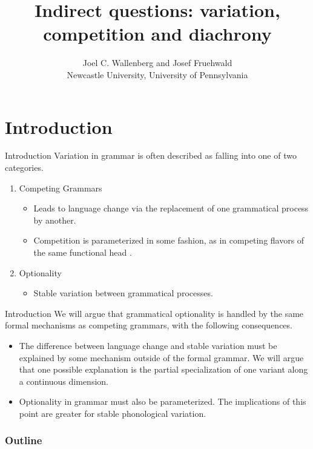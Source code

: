 \documentclass[hyperref={pdfpagelabels=false}]{beamer}
\title{Indirect questions: variation, competition and diachrony}
\author{Joel C. Wallenberg and Josef Fruehwald\\Newcastle University, University of Pennsylvania}%
\institute{}
\begin{document}
\begin{frame}[plain]
\titlepage
\end{frame}


\section{Introduction}
\begin{frame}{Introduction}
	Variation in grammar is often described as falling into one of two categories.
	
	\begin{enumerate}
		\item Competing Grammars
		\begin{itemize}
			\item Leads to language change via the replacement of one grammatical process by another.
			\item Competition is parameterized in some fashion, as in competing flavors of the same functional head \citep{kroch1994}.
		\end{itemize}
		\item Optionality
		\begin{itemize}
			\item Stable variation between grammatical processes.
		\end{itemize}
	\end{enumerate}
	
\end{frame}

\begin{frame}{Introduction}
	We will argue that grammatical optionality is handled by the same formal mechanisms as competing grammars, with the following consequences.
	\begin{itemize}
		\item The difference between language change and stable variation must be explained by some mechanism outside of the formal grammar. We will argue that one possible explanation is the partial specialization of one variant along a continuous dimension.
		\item Optionality in grammar must also be parameterized. The implications of this point are greater for stable phonological variation.
	\end{itemize}

\end{frame}

\begin{frame}
\frametitle{Outline}
\tableofcontents
\end{frame}
\end{document}
